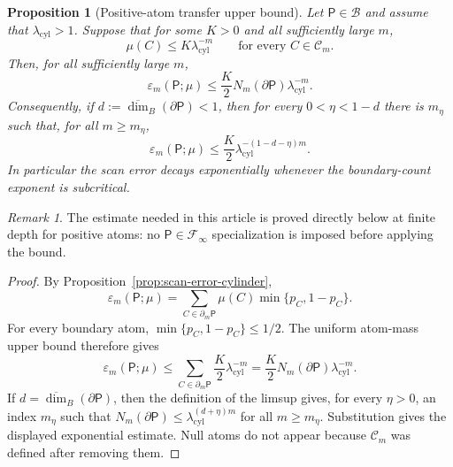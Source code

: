 \documentclass{etds}%
\numberwithin{equation}{section}
\theoremstyle{plain}
\newtheorem{proposition}[theorem]{Proposition}
\theoremstyle{definition}
\theoremstyle{remark}
\newtheorem{remark}[theorem]{Remark}
\begin{document}
\begin{proposition}[Positive-atom transfer upper bound]
\label{prop:boundary-dimension}
Let $\mathsf{P}\in\mathcal{B}$ and assume that
$\lambda_{\mathrm{cyl}}>1$.  Suppose that for some $K>0$ and all sufficiently
large $m$,
\[
\mu(C)\le K\lambda_{\mathrm{cyl}}^{-m}
\qquad\text{for every }C\in\mathcal{C}_m.
\]
Then, for all sufficiently large $m$,
\[
\varepsilon_m(\mathsf{P};\mu)
\le \frac{K}{2}N_m(\partial\mathsf{P})\lambda_{\mathrm{cyl}}^{-m}.
\]
Consequently, if
$d:=\overline{\dim}_B(\partial\mathsf{P})<1$, then for every
$0<\eta<1-d$ there is $m_\eta$ such that, for all $m\ge m_\eta$,
\[
\varepsilon_m(\mathsf{P};\mu)
\le \frac{K}{2}
\lambda_{\mathrm{cyl}}^{-(1-d-\eta)m}.
\]
In particular the scan error decays exponentially whenever the boundary-count
exponent is subcritical.
\end{proposition}

\begin{remark}
The estimate needed in this article is proved directly below at finite depth
for positive atoms: no $\mathsf{P}\in\mathcal{F}_\infty$ specialization is
imposed before applying the bound.
\end{remark}

\begin{proof}
By Proposition~\ref{prop:scan-error-cylinder},
\[
\varepsilon_m(\mathsf{P};\mu)
=\sum_{C\in\partial_m\mathsf{P}}\mu(C)\min\{p_C,1-p_C\}.
\]
For every boundary atom, $\min\{p_C,1-p_C\}\le1/2$.  The uniform atom-mass
upper bound therefore gives
\[
\varepsilon_m(\mathsf{P};\mu)
\le \sum_{C\in\partial_m\mathsf{P}}\frac{K}{2}\lambda_{\mathrm{cyl}}^{-m}
=\frac{K}{2}N_m(\partial\mathsf{P})\lambda_{\mathrm{cyl}}^{-m}.
\]
If $d=\overline{\dim}_B(\partial\mathsf{P})$, then the definition of the
limsup gives, for every $\eta>0$, an index $m_\eta$ such that
$N_m(\partial\mathsf{P})\le
\lambda_{\mathrm{cyl}}^{(d+\eta)m}$ for all $m\ge m_\eta$.  Substitution gives
the displayed exponential estimate.  Null atoms do not appear because
$\mathcal{C}_m$ was defined after removing them.
\end{proof}
\end{document}
